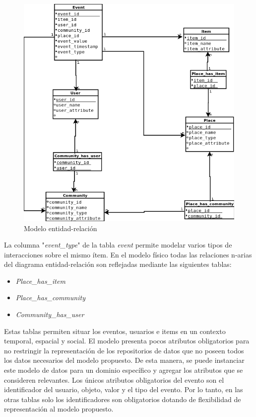 \begin{figure}[tp]
	\centering
	\includegraphics[scale=.6]{images/modeloentidadrelacion.png}
	\caption{Modelo entidad-relación }
	\label{fig:modeloentidadrelacion}
\end{figure}

La columna "\textit{event\_type}" de la tabla \textit{event}  permite modelar varios tipos de interacciones sobre el mismo ítem. En el modelo físico todas las relaciones n-arias del diagrama entidad-relación son reflejadas mediante las siguientes tablas:

\begin{itemize}
	\item \textit{Place\_has\_item}
	\item \textit{Place\_has\_community}
	\item \textit{Community\_has\_user}
\end{itemize}

Estas tablas permiten situar los eventos, usuarios e items en un contexto temporal, espacial y social. El modelo presenta pocos atributos obligatorios para no restringir la representación de los repositorios de datos que no poseen todos los datos necesarios del modelo propuesto. De esta manera, se puede instanciar este modelo de datos para un dominio específico y agregar los atributos que se consideren relevantes. Los únicos atributos obligatorios del evento son el identificador del usuario, objeto, valor y el tipo del evento. Por lo tanto, en las otras tablas solo los identificadores son obligatorios dotando de flexibilidad de representación al modelo propuesto.

